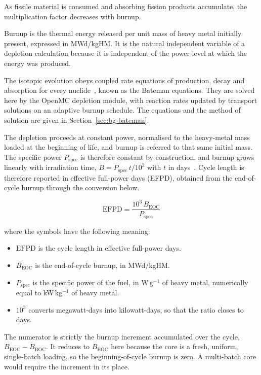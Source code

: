 As fissile material is consumed and absorbing fission products
accumulate, the multiplication factor decreases with burnup.

Burnup is the thermal energy released per unit mass of heavy metal
initially present, expressed in MWd/kgHM. It is the natural independent
variable of a depletion calculation because it is independent of the
power level at which the energy was produced.

The isotopic evolution obeys coupled rate equations of production,
decay and absorption for every nuclide~\cite{duderstadt_hamilton_1976},
known as the Bateman equations. They are solved here by the OpenMC
depletion module, with reaction rates updated by transport solutions on
an adaptive burnup schedule. The equations and the method of solution
are given in Section~\ref{sec:bg-bateman}.

The depletion proceeds at constant power, normalised to the heavy-metal
mass loaded at the beginning of life, and burnup is referred to that same
initial mass. The specific power $P_\mathrm{spec}$ is therefore constant
by construction, and burnup grows linearly with irradiation time,
$B = P_\mathrm{spec}\,t/10^{3}$ with $t$ in days~\cite{lee_2020}.
Cycle length is
therefore reported in effective full-power days (EFPD), obtained from
the end-of-cycle burnup through the conversion below.

\begin{equation}
\mathrm{EFPD} = \frac{10^{3}\,B_\mathrm{EOC}}{P_\mathrm{spec}}
\label{eq:efpd}
\end{equation}

\noindent where the symbols have the following meaning:

\begin{itemize}
  \item $\mathrm{EFPD}$ is the cycle length in effective full-power
        days.

  \item $B_\mathrm{EOC}$ is the end-of-cycle burnup, in MWd/kgHM.

  \item $P_\mathrm{spec}$ is the specific power of the fuel, in
        W\,g$^{-1}$ of heavy metal, numerically equal to
        kW\,kg$^{-1}$ of heavy metal.

  \item $10^{3}$ converts megawatt-days into kilowatt-days, so that the
        ratio closes to days.
\end{itemize}

The numerator is strictly the burnup increment accumulated over the
cycle, $B_\mathrm{EOC} - B_\mathrm{BOC}$. It reduces to
$B_\mathrm{EOC}$ here because the core is a fresh, uniform,
single-batch loading, so the beginning-of-cycle burnup is zero. A
multi-batch core would require the increment in its place.

